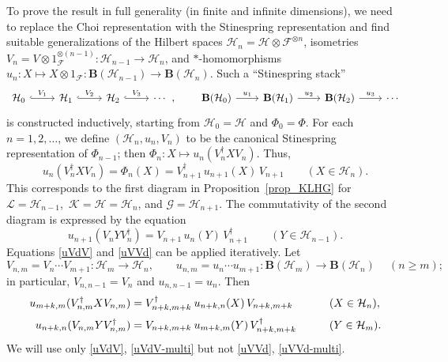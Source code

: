 \documentclass[12pt]{article}
\newcommand{\calF}{\mathcal{F}}
\newcommand{\calG}{\mathcal{G}}
\newcommand{\calH}{\mathcal{H}}
\newcommand{\calK}{\mathcal{K}}
\newcommand{\calL}{\mathcal{L}}
\newcommand{\ts}{\mkern1mu}
\newcommand{\Bo}{\mathbf{B}}
\renewcommand{\ge}{\geqslant}
\newtheorem[definition]{Definition}[Theorem]{Definition}
\newtheorem[remark]{Example}[Theorem]{Example}
\newtheorem[remark]{Remark}[Theorem]{Remark}
\newtheorem[remark]{Question}[Theorem]{Open question}
\newtheorem*[definition]{definition}{Definition}
\newtheorem*[remark]{example}{Example}
\newtheorem*[remark]{remark}{Remark}
\newtheorem*[remark]{question}{Open question}
\numberwithin{equation}{section}
\begin{document}
To prove the result in full generality (in finite and infinite dimensions), we need to replace the Choi representation with the Stinespring representation and find suitable generalizations of the Hilbert spaces $\calH_n=\calH\otimes\calF^{\otimes n}$, isometries $V_n=V\otimes 1_\calF^{\otimes(n-1)}\colon\calH_{n-1}\to\calH_{n}$, and \hbox{$*$-homomorphisms} $u_n\colon X\mapsto X\otimes1_\calF\colon \Bo(\calH_{n-1})\to\Bo(\calH_{n})$. Such a ``Stinespring stack''
\begin{equation}
\begin{tikzcd}[column sep=24pt]
\calH_0 \arrow[r,hookrightarrow,"V_1"] &
\calH_1 \arrow[r,hookrightarrow,"V_2"] &
\calH_2 \arrow[r,hookrightarrow,"V_3"] & \cdots
\end{tikzcd}\,,\qquad
\begin{tikzcd}[column sep=22pt]
\Bo(\calH_0) \arrow[r,"u_1"] &
\Bo(\calH_1) \arrow[r,"u_2"] &
\Bo(\calH_2) \arrow[r,"u_3"] & \cdots
\end{tikzcd}
\end{equation}
is constructed inductively, starting from $\calH_0=\calH$ and $\Phi_0=\Phi$. For each $n=1,2,\ldots$, we define $(\calH_n,u_n,V_n)$ to be the canonical Stinespring representation of $\Phi_{n-1}$; then $\Phi_n\colon X\mapsto u_n(V_n^\dag XV_n)$. Thus,
\begin{equation}\label{uVdV}
u_n(V_n^\dag XV_n)=\Phi_n(X)=V_{n+1}^\dag\, u_{n+1}(X)\, V_{n+1}\qquad
(X\in\calH_n).
\end{equation}
This corresponds to the first diagram in Proposition~\ref{prop_KLHG} for $\calL=\calH_{n-1}$,\, $\calK=\calH=\calH_n$,  and $\calG=\calH_{n+1}$. The commutativity of the second diagram is expressed by the equation
\begin{equation}\label{uVVd}
u_{n+1}(V_n YV_n^\dag)=V_{n+1}\, u_n(Y)\, V_{n+1}^\dag\qquad
(Y\in\calH_{n-1}).
\end{equation}
Equations \eqref{uVdV} and \eqref{uVVd} can be applied iteratively. Let
\begin{equation}
V_{n,m}=V_n\cdots V_{m+1}\colon\calH_m\to\calH_n,\qquad
u_{n,m}=u_n\cdots u_{m+1}\colon\Bo(\calH_m)\to\Bo(\calH_n)\quad\:
(n\ge m);
\end{equation}
in particular, $V_{n,n-1}=V_n$ and $u_{n,n-1}=u_n$. Then
\begin{alignat}{2}
\label{uVdV-multi}
u_{m+k,m}(V_{n,m}^\dag XV_{n,m})
&=V_{n+k,m+k}^\dag\,\ts u_{n+k,n}(X)\,V_{n+k,m+k}\qquad && (X\in\calH_n),
\\[2pt]
\label{uVVd-multi}
u_{n+k,n}(V_{n,m}YV_{n,m}^\dag)
&=V_{n+k,m+k}\,\ts u_{m+k,m}(Y)\,V_{n+k,m+k}^\dag\qquad && (Y\in\calH_m).
\end{alignat}
We will use only \eqref{uVdV}, \eqref{uVdV-multi} but not \eqref{uVVd}, \eqref{uVVd-multi}.
\end{document}
